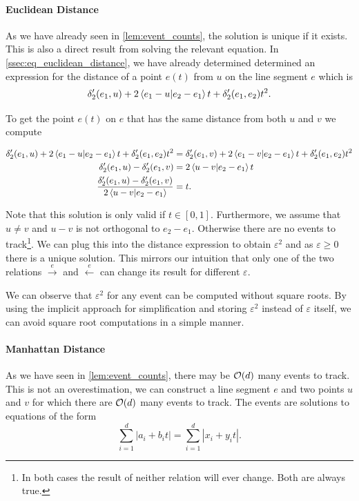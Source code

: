 \paragraph{Euclidean Distance}
As we have already seen in \cref{lem:event_counts}, the solution is unique if it exists. This is also a direct result from solving the relevant equation. In \cref{ssec:eq_euclidean_distance}, we have already determined determined an expression for the distance of a point \(e(t)\) from \(u\) on the line segment \(e\) which is 
	\[\delta_2'(e_1, u) + 2\braket{e_1 - u | e_2 - e_1}t + \delta_2'(e_1, e_2)t^2.\]

To get the point \(e(t)\) on \(e\) that has the same distance from both \(u\) and \(v\) we compute 

\begin{align*}
	\delta_2'(e_1, u) + 2\braket{e_1 - u | e_2 - e_1}t + \delta_2'(e_1, e_2)t^2 &= \delta_2'(e_1, v) + 2\braket{e_1 - v | e_2 - e_1}t + \delta_2'(e_1, e_2)t^2\\
	\delta_2'(e_1, u) - \delta_2'(e_1, v) &=  2\braket{u -v | e_2 - e_1}t \\
	\frac{\delta_2'(e_1, u) - \delta_2'(e_1, v)}{2\braket{u -v | e_2 - e_1}} &=  t. \\
\end{align*}

Note that this solution is only valid if \(t \in [0, 1]\). Furthermore, we assume that \(u \neq v\) and \(u-v\) is not orthogonal to \(e_2 - e_1\). Otherwise there are no events to track\footnote{In both cases the result of neither relation will ever change. Both are always true.}. We can plug this into the distance expression to obtain \(\varepsilon^2\) and as \(\varepsilon \geq 0\) there is a unique solution. This mirrors our intuition that only one of the two relations \(\overset e\rightarrow\) and \(\overset e\leftarrow\) can change its result for different \(\varepsilon\).

We can observe that \(\varepsilon^2\) for any event can be computed without square roots. By using the implicit approach for simplification and storing \(\varepsilon^2\) instead of \(\varepsilon\) itself, we can avoid square root computations in a simple manner. 

\paragraph{Manhattan Distance}

As we have seen in \cref{lem:event_counts}, there may be \(\mathcal{O}(d)\) many events to track. This is not an overestimation, we can construct a line segment \(e\) and two points \(u\) and \(v\) for which there are \(\mathcal{O}(d)\) many events to track. The events are solutions to equations of the form 
\begin{equation}\label{eq:ds-manhattan}
	\sum_{i=1}^d |a_i + b_i t| = \sum_{i=1}^d |x_i + y_i t|.
\end{equation}

